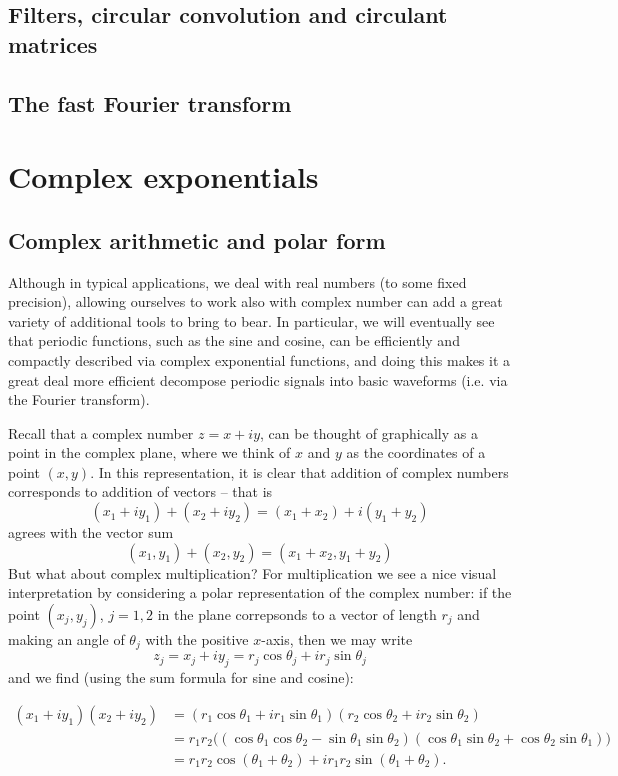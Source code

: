 \documentclass[12pt]{report}
\theoremstyle{plain}
\begin{document}
\section{Filters, circular convolution and circulant matrices}

\section{The fast Fourier transform}

\appendix

\chapter{Complex exponentials}

\section{Complex arithmetic and polar form}

Although in typical applications, we deal with real numbers (to some fixed precision), allowing ourselves to work also with complex number can add a great variety of additional tools to bring to bear. In particular, we will eventually see that periodic functions, such as the sine and cosine, can be efficiently and compactly described via complex exponential functions, and doing this makes it a great deal more efficient decompose periodic signals into basic waveforms (i.e. via the Fourier transform).

Recall that a complex number $z = x + iy$, can be thought of graphically as a point in the complex plane, where we think of $x$ and $y$ as the coordinates of a point $(x, y)$. In this representation, it is clear that addition of complex numbers corresponds to addition of vectors -- that is
\[ (x_1 + i y_1) + (x_2 + i y_2) = (x_1 + x_2) + i (y_1 + y_2)\]
agrees with the vector sum
\[ (x_1, y_1) + (x_2, y_2) = (x_1 + x_2, y_1 + y_2) \]
But what about complex multiplication? For multiplication we see a nice visual interpretation by considering a polar representation of the complex number: if the point $(x_j, y_j)$, $j = 1, 2$ in the plane correpsonds to a vector of length $r_j$ and making an angle of $\theta_j$ with the positive $x$-axis, then we may write
\[z_j = x_j + i y_j = r_j \cos \theta_j + i r_j \sin \theta_j \]
and we find (using the sum formula for sine and cosine):

\begin{align} \label{angles add}
(x_1 + i y_1)(x_2 + i y_2) &= (r_1 \cos \theta_1 + i r_1 \sin \theta_1)(r_2 \cos \theta_2 + i r_2 \sin \theta_2) \\ &= r_1 r_2 \Big( (\cos \theta_1 \cos \theta_2 - \sin \theta_1 \sin \theta_2) (\cos \theta_1 \sin \theta_2 + \cos \theta_2 \sin \theta_1 )\Big) \\ &= r_1 r_2 \cos (\theta_1 + \theta_2) + i r_1 r_2 \sin (\theta_1 + \theta_2).
\end{align}
\end{document}
